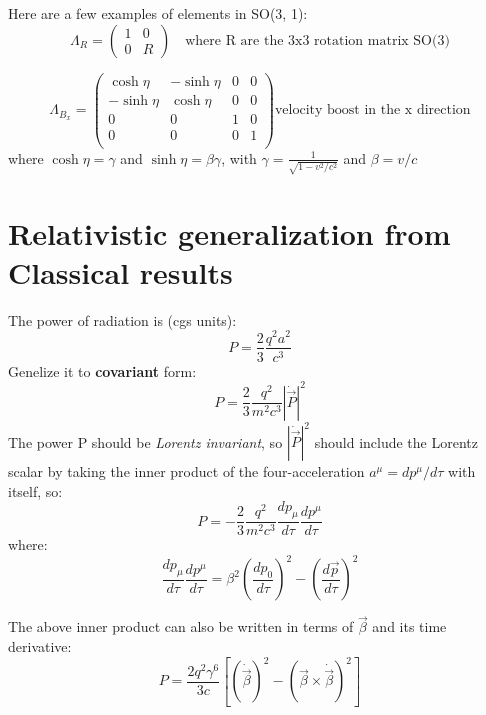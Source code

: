 Here are a few examples of elements in SO(3, 1):
\begin{equation*}
    \Lambda_R = 
    \begin{pmatrix}
	1   & 0	\\
	0   & R
    \end{pmatrix}
    \quad \text{where R are the 3x3 rotation matrix SO(3)}
\end{equation*}

\begin{equation*}
    \Lambda_{B_x} = 
    \begin{pmatrix}
	\cosh\eta   & -\sinh\eta    & 0	& 0 \\
	-\sinh\eta   & \cosh\eta    & 0	& 0 \\
	0   & 0 & 1 & 0 \\
	0   & 0 & 0 & 1 \\
    \end{pmatrix}
    \text{velocity boost in the x direction}
\end{equation*}
where $\cosh\eta = \gamma$ and $\sinh\eta = \beta\gamma$, with $\gamma = \frac{1}{\sqrt{1-v^2/c^2}}$
and $\beta = v/c$

\section{Relativistic generalization from Classical results}
The power of radiation is (cgs units):
\[
    P = \frac{2}{3}\frac{q^2a^2}{c^3}
\]
Genelize it to \textbf{covariant} form:
\[
    P = \frac{2}{3}\frac{q^2}{m^2c^3}|\dot{\vec{P}}|^2
\]
The power P should be \emph{Lorentz invariant}, so $|\dot{\vec{P}}|^2$ 
should include the Lorentz scalar by taking the inner product of the 
four-acceleration $a^\mu = dp^\mu/d\tau$ with itself, so:
\[
    P = -\frac{2}{3}\frac{q^2}{m^2c^3}\frac{dp_\mu}{d\tau}\frac{dp^\mu}{d\tau}
\]
where:
\[
    \frac{dp_\mu}{d\tau}\frac{dp^\mu}{d\tau} = \beta^2 \left( \frac{dp_0}{d\tau} \right)^2 - \left( \frac{d\vec{p}}{d\tau} \right)^2
\]

The above inner product can also be written in terms of $\vec{\beta}$ and
its time derivative:
\[
    P = \frac{2q^2\gamma^6}{3c}\left[ (\dot{\vec{\beta}})^2 - (\vec{\beta} \times \dot{\vec{\beta}})^2 \right]
\]



